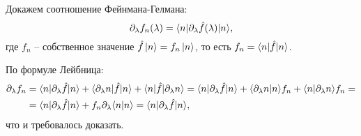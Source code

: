 Докажем соотношение Фейнмана-Гелмана:
\begin{equation*}
    \partial_\lambda f_n (\lambda) = \bk{n}[\partial_\lambda \hat{f}(\lambda)]{n},
\end{equation*}
где $f_n$ -- собственное значение $\hat{f} \left| n \right\rangle = f_n \left| n \right\rangle$, то есть $f_n = \bk{n}[\hat{f}]{n}$. 

По формуле Лейбница:
\begin{align*}
    \partial_\lambda f_n 
    &= 
    \bk{n}[\partial_\lambda \hat{f}]{n} + 
    \bk{\partial_\lambda n}[\hat{f}]{n} + \bk{n}[\hat{f}]{\partial_\lambda n} 
    =
    \bk{n}[\partial_\lambda \hat{f}]{n} + \bk{\partial_\lambda n}{n} f_n + 
    \bk{n}{\partial_\lambda n} f_n 
    = \\ &=
    \bk{n}[\partial_\lambda \hat{f}]{n} + f_n \partial_\lambda \bk{n}{n} 
    = 
    \bk{n}[\partial_\lambda \hat{f}]{n},
\end{align*}
что и требовалось доказать.